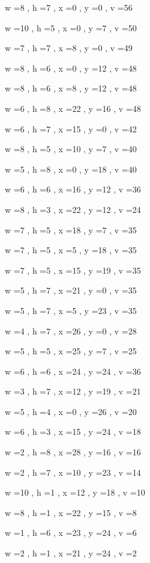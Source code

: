 \documentclass[11pt]{article}
\begin{document}
w =8 , h =7 , x =0 , y =0 , v =56
\par
w =10 , h =5 , x =0 , y =7 , v =50
\par
w =7 , h =7 , x =8 , y =0 , v =49
\par
w =8 , h =6 , x =0 , y =12 , v =48
\par
w =8 , h =6 , x =8 , y =12 , v =48
\par
w =6 , h =8 , x =22 , y =16 , v =48
\par
w =6 , h =7 , x =15 , y =0 , v =42
\par
w =8 , h =5 , x =10 , y =7 , v =40
\par
w =5 , h =8 , x =0 , y =18 , v =40
\par
w =6 , h =6 , x =16 , y =12 , v =36
\par
w =8 , h =3 , x =22 , y =12 , v =24
\par
w =7 , h =5 , x =18 , y =7 , v =35
\par
w =7 , h =5 , x =5 , y =18 , v =35
\par
w =7 , h =5 , x =15 , y =19 , v =35
\par
w =5 , h =7 , x =21 , y =0 , v =35
\par
w =5 , h =7 , x =5 , y =23 , v =35
\par
w =4 , h =7 , x =26 , y =0 , v =28
\par
w =5 , h =5 , x =25 , y =7 , v =25
\par
w =6 , h =6 , x =24 , y =24 , v =36
\par
w =3 , h =7 , x =12 , y =19 , v =21
\par
w =5 , h =4 , x =0 , y =26 , v =20
\par
w =6 , h =3 , x =15 , y =24 , v =18
\par
w =2 , h =8 , x =28 , y =16 , v =16
\par
w =2 , h =7 , x =10 , y =23 , v =14
\par
w =10 , h =1 , x =12 , y =18 , v =10
\par
w =8 , h =1 , x =22 , y =15 , v =8
\par
w =1 , h =6 , x =23 , y =24 , v =6
\par
w =2 , h =1 , x =21 , y =24 , v =2
\par
\newpage


\end{document}

